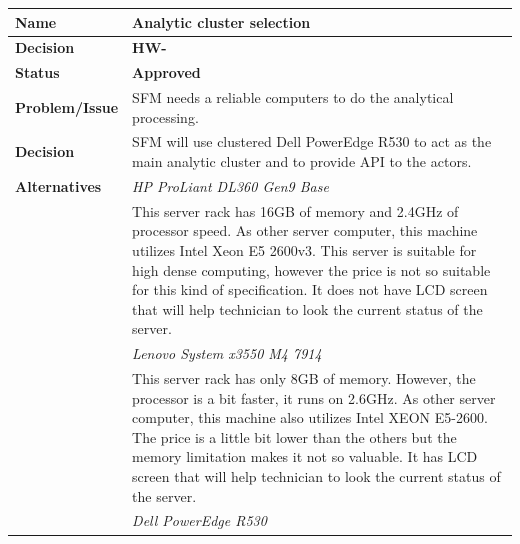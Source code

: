 \begin{table}[h!]
\begin{tabular}{L{0.2\textwidth} L{0.6\textwidth}}
    \textbf{Name}           & \textbf{Analytic cluster selection} \\ \toprule
    \textbf{Decision}       & \textbf{HW-\textbf{}}\\ \midrule
    \textbf{Status}         & \textbf{Approved} \\ \midrule
    \textbf{Problem/Issue}  & SFM needs a reliable computers to do the analytical processing. \\ \midrule
    \textbf{Decision}       & SFM will use clustered Dell PowerEdge R530 to act as the main analytic cluster and to provide API to the actors.\\ \midrule
    \textbf{Alternatives}   & \textit{HP ProLiant DL360 Gen9 Base}\\
                            & This server rack has 16GB of memory and 2.4GHz of processor speed. As other server computer, this machine utilizes Intel Xeon E5 2600v3. This server is suitable for high dense computing, however the price is not so suitable for this kind of specification. It does not have LCD screen that will help technician to look the current status of the server.\\
                            & \textit{Lenovo System x3550 M4 7914}\\
                            & This server rack has only 8GB of memory. However, the processor is a bit faster, it runs on 2.6GHz. As other server computer, this machine also utilizes Intel XEON E5-2600. The price is a little bit lower than the others but the memory limitation makes it not so valuable. It has LCD screen that will help technician to look the current status of the server. \\
                            & \textit{Dell PowerEdge R530} \\

\end{tabular}
\end{table}

